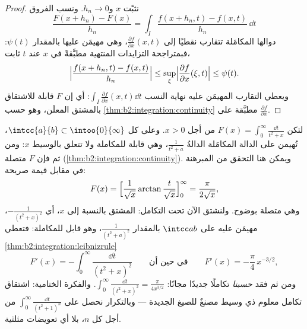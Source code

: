 \begin{proof}
نثبّت $x$ و$h_n \to 0$. ونسب الفروق
\[
\frac{F(x + h_n) - F(x)}{h_n}
= \int_I \frac{f(x + h_n, t) - f(x, t)}{h_n}\,\dd t
\]
دوالها المكامَلة تتقارب نقطيًا إلى $\frac{\partial f}{\partial
x}(x, t)$، وهي مهيمَن عليها بالمقدار $\psi(t)$: فبمتراجحة التزايدات
المنتهية مطبَّقةً في $x$ عند $t$ ثابت،
\[
\Bigl|\frac{f(x + h_n, t) - f(x,t)}{h_n}\Bigr|
\leq \sup_{\xi} \Bigl|\frac{\partial f}{\partial x}(\xi, t)\Bigr|
\leq \psi(t) .
\]
ويعطي التقارب المهيمَن عليه نهاية النسب $\int_I \frac{\partial
f}{\partial x}(x,t)\dd t$: أي إن $F$ قابلة للاشتقاق
بالمشتق المعلَن، وهو  حسب
\cref{thm:b2:integration:continuity} مطبَّقة على $\frac{\partial
f}{\partial x}$.
\end{proof}

\begin{example}\label{ex:b2:integration:arctanparam}
لتكن $F(x) = \displaystyle\int_0^\infty \frac{\dd t}{t^2 + x}$
من أجل $x > 0$. وعلى كل $\intcc{a}{b} \subset \intoo{0}{\infty}$،
تُهيمن على الدالة المكامَلة الدالةُ $\frac{1}{t^2 + a}$، وهي قابلة للمكاملة
ولا تتعلق بالوسيط $x$: ومن ثم فإن $F$ متصلة
(\cref{thm:b2:integration:continuity}). ويمكن هنا التحقق من المبرهنة
في مقابل قيمة صريحة:
\[
F(x) = \Bigl[\frac{1}{\sqrt x}\arctan\frac{t}{\sqrt
x}\Bigr]_0^\infty = \frac{\pi}{2\sqrt x} ,
\]
وهي متصلة بوضوح. ولنشتق الآن تحت التكامل:
المشتق بالنسبة إلى $x$، أي $-\frac{1}{(t^2+x)^2}$، مهيمَن عليه على
$\intcc ab$ بالمقدار $\frac{1}{(t^2+a)^2}$، وهو قابل للمكاملة:
فتعطي \cref{thm:b2:integration:leibnizrule}
\[
F'(x) = -\int_0^\infty \frac{\dd t}{(t^2 + x)^2}
\qquad\text{في حين أن}\qquad
F'(x) = -\frac{\pi}{4}\,x^{-3/2} ,
\]
ومن ثم فقد \emph{حسبنا} تكاملًا جديدًا مجانًا:
$\int_0^\infty\frac{\dd t}{(t^2+x)^2} = \frac{\pi}{4x^{3/2}}$.
والفكرة الختامية: اشتقاق تكامل معلوم ذي وسيط مصنعٌ
للصيغ الجديدة --- وبالتكرار نحصل على
$\int_0^\infty\frac{\dd t}{(t^2+1)^n}$ من أجل كل $n$، بلا أي
تعويضات مثلثية.
\end{example}

